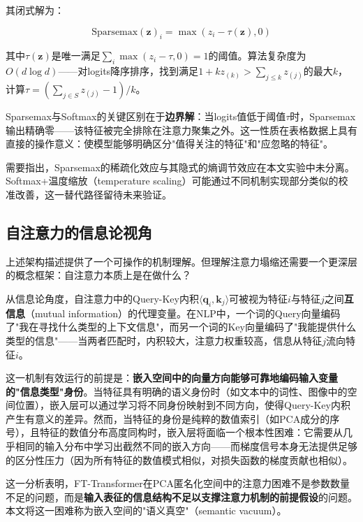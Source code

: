 其闭式解为：

\begin{equation}
\mathrm{Sparsemax}(\mathbf{z})_i = \max(z_i - \tau(\mathbf{z}), 0)
\label{eq:sparsemax_closed}
\end{equation}

其中$\tau(\mathbf{z})$是唯一满足$\sum_i \max(z_i - \tau, 0) = 1$的阈值。算法复杂度为$O(d \log d)$——对logits降序排序，找到满足$1 + k z_{(k)} > \sum_{j\leq k} z_{(j)}$的最大$k$，计算$\tau = (\sum_{j\in S} z_{(j)} - 1)/k$。

Sparsemax与Softmax的关键区别在于\textbf{边界解}：当logits值低于阈值$\tau$时，Sparsemax输出精确零——该特征被完全排除在注意力聚集之外。这一性质在表格数据上具有直接的操作意义：使模型能够明确区分"值得关注的特征"和"应忽略的特征"。

需要指出，Sparsemax的稀疏化效应与其隐式的熵调节效应在本文实验中未分离。Softmax+温度缩放（temperature scaling）可能通过不同机制实现部分类似的校准改善，这一替代路径留待未来验证。

\subsection{自注意力的信息论视角}

上述架构描述提供了一个可操作的机制理解。但理解注意力塌缩还需要一个更深层的概念框架：自注意力本质上是在做什么？

从信息论角度，自注意力中的Query-Key内积$\langle \mathbf{q}_i, \mathbf{k}_j \rangle$可被视为特征$i$与特征$j$之间\textbf{互信息}（mutual information）的代理变量。在NLP中，一个词的Query向量编码了"我在寻找什么类型的上下文信息"，而另一个词的Key向量编码了"我能提供什么类型的信息"——当两者匹配时，内积较大，注意力权重较高，信息从特征$j$流向特征$i$。

这一机制有效运行的前提是：\textbf{嵌入空间中的向量方向能够可靠地编码输入变量的"信息类型"身份}。当特征具有明确的语义身份时（如文本中的词性、图像中的空间位置），嵌入层可以通过学习将不同身份映射到不同方向，使得Query-Key内积产生有意义的差异。然而，当特征的身份是纯粹的数值索引（如PCA成分的序号），且特征的数值分布高度同构时，嵌入层将面临一个根本性困难：它需要从几乎相同的输入分布中学习出截然不同的嵌入方向——而梯度信号本身无法提供足够的区分性压力（因为所有特征的数值模式相似，对损失函数的梯度贡献也相似）。

这一分析表明，FT-Transformer在PCA匿名化空间中的注意力困难不是参数数量不足的问题，而是\textbf{输入表征的信息结构不足以支撑注意力机制的前提假设}的问题。本文将这一困难称为嵌入空间的"语义真空"（semantic vacuum）。

